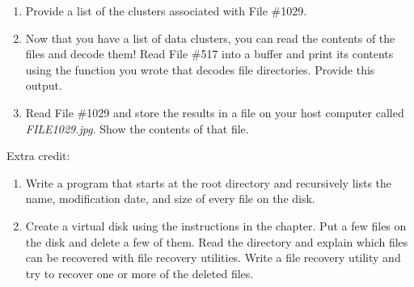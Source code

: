 \begin{enumerate}
  Recall that sectors on a FAT volume used to hold user data are
  called \emph{clusters};  each cluster may consist of one or
  more sectors (blocks). Each file can therefore be referred to by the
  number of the cluster where the first byte of file data is
  stored. The FAT array for each cluster contains a pointer to the
  location of the next cluster or a special value indicating there are
  no more data clusters. Each file is therefore described by a linked
  list of cluster numbers, and all of the linked lists for all of the
  files are stored within the fAT.

  For the remainder of this problem set we will be working with two
  files. File \#517 is the
  directory \verb|\DCIM\100CANON\| while File \#1029 is the JPEG image
  \verb|IMG_0001.JPG| in that directory.

  Once you have modified \texttt{mbrdecode.py} to read the entire FAT
  into memory, modify it further to print all of the cluster numbers 
  associated with File \#517. Provide a list of the clusters.

\item Provide a list of the clusters associated with File \#1029.

\item Now that you have a list of data clusters, you can read the
  contents of the files and decode them!  Read File \#517 into a
  buffer and print its contents using the function you wrote that
  decodes file directories. Provide this output.

\item Read File \#1029 and store the results in a file on your host
  computer called \emph{FILE1029.jpg}. Show the contents of that file.

\end{enumerate}
  
Extra credit:


\begin{enumerate}
\item Write a program that starts at the root
  directory and recursively lists the name, modification date, and
  size of every file on the disk.
\item Create a virtual disk using the instructions in the chapter. Put
  a few files on the disk and delete a few of them. Read the directory
  and explain which files can be recovered with file recovery
  utilities. Write a file recovery utility and try to recover one or
  more of the deleted files.
\end{enumerate}




